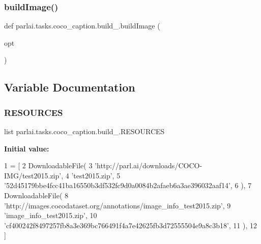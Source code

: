 \mbox{\label{namespaceparlai_1_1tasks_1_1coco__caption_1_1build__2015_a52edd896124184ec02d76b23368557aa}} 
\subsubsection{\texorpdfstring{build\+Image()}{buildImage()}}
{\footnotesize\ttfamily def parlai.\+tasks.\+coco\+\_\+caption.\+build\+\_.\+build\+Image (\begin{DoxyParamCaption}\item[{}]{opt }\end{DoxyParamCaption})}



\subsection{Variable Documentation}
\mbox{\label{namespaceparlai_1_1tasks_1_1coco__caption_1_1build__2015_ab0466bad8206a86ea4c5210536113ec2}} 
\subsubsection{\texorpdfstring{R\+E\+S\+O\+U\+R\+C\+ES}{RESOURCES}}
{\footnotesize\ttfamily list parlai.\+tasks.\+coco\+\_\+caption.\+build\+\_.\+R\+E\+S\+O\+U\+R\+C\+ES}

{\bfseries Initial value\+:}
\begin{DoxyCode}
1 =  [
2     DownloadableFile(
3         \textcolor{stringliteral}{'http://parl.ai/downloads/COCO-IMG/test2015.zip'},
4         \textcolor{stringliteral}{'test2015.zip'},
5         \textcolor{stringliteral}{'52d45179bbe4fcc41ba16550b3df532fc9d0a0084b2afaeb6a3ae396032aaf14'},
6     ),
7     DownloadableFile(
8         \textcolor{stringliteral}{'http://images.cocodataset.org/annotations/image\_info\_test2015.zip'},
9         \textcolor{stringliteral}{'image\_info\_test2015.zip'},
10         \textcolor{stringliteral}{'cf400242f8497257fb8a3e369bc766491f4a7e42625fb3d72555504e9a8c3b18'},
11     ),
12 ]
\end{DoxyCode}
